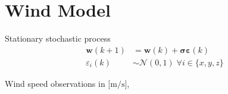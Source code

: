 \ETHslide
\section*{Wind Model}


\begin{minipage}{0.5\textwidth}
Stationary stochastic process
\begin{align}
\mathbf{w}(k+1) &= \mathbf{w}(k) + \boldsymbol{\sigma} \boldsymbol{\varepsilon}(k) \nonumber \\ 
{\varepsilon}_i (k) &\sim \mathcal{N}(0,1) \; \forall i \in \{ x,y,z \} \nonumber
\end{align}
\end{minipage}
\begin{minipage}{0.49\textwidth}
	\centering
	\tiny{
	
	
	\tiny{Wind speed observations in $[\si{\metre\per\second}$], \cite{www:googleheliostat}} 
	}
\end{minipage}

\clearpage